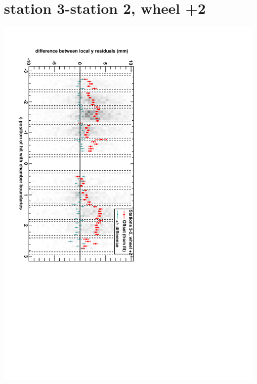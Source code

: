 \documentclass[compress]{beamer}
\begin{document}
\section*{station 3-station 2, wheel +2}
\begin{frame} \vfill \mbox{\hspace{-1 cm}\includegraphics[height=1.2\linewidth, angle=90]{DTzdiff23VsPhi_whE_slope.pdf}} \end{frame}
\end{document}
